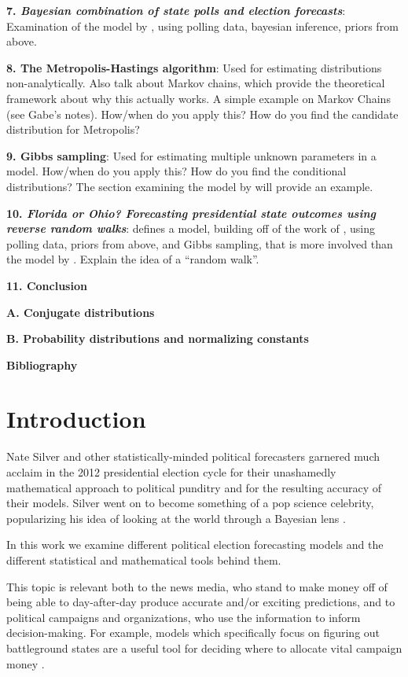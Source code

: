 \documentclass[12pt]{report}
\begin{document}
\textbf{7. \emph{Bayesian combination of state polls and election forecasts}}: Examination of the model by \cite{Lock:2010aa}, using polling data, bayesian inference, priors from above.

\textbf{8. The Metropolis-Hastings algorithm}: Used for estimating distributions non-analytically. Also talk about Markov chains, which provide the theoretical framework about why this actually works. A simple example on Markov Chains (see Gabe's notes). How/when do you apply this? How do you find the candidate distribution for Metropolis?

\textbf{9. Gibbs sampling}: Used for estimating multiple unknown parameters in a model. How/when do you apply this? How do you find the conditional distributions? The section examining the model by \cite{Strauss:2007aa} will provide an example.

\textbf{10. \emph{{Florida} or {Ohio}? {F}orecasting presidential state outcomes using reverse random walks}}: \cite{Strauss:2007aa} defines a model, building off of the work of \cite{Jackman:2005aa}, using polling data, priors from above, and Gibbs sampling, that is more involved than the model by \cite{Lock:2010aa}. Explain the idea of a ``random walk''.

\textbf{11. Conclusion}

\textbf{A. Conjugate distributions}

\textbf{B. Probability distributions and normalizing constants}

\textbf{Bibliography}

\setcounter{chapter}{0}
\chapter{Introduction}

Nate Silver and other statistically-minded political forecasters garnered much acclaim in the 2012 presidential election cycle for their unashamedly mathematical approach to political punditry and for the resulting accuracy of their models. Silver went on to become something of a pop science celebrity, popularizing his idea of looking at the world through a Bayesian lens \citep{Silver:2012aa}.

In this work we examine different political election forecasting models and the different statistical and mathematical tools behind them.

This topic is relevant both to the news media, who stand to make money off of being able to day-after-day produce accurate and/or exciting predictions, and to political campaigns and organizations, who use the information to inform decision-making. For example, models which specifically focus on figuring out battleground states are a useful tool for deciding where to allocate vital campaign money \citep{Strauss:2007aa}.
\end{document}
